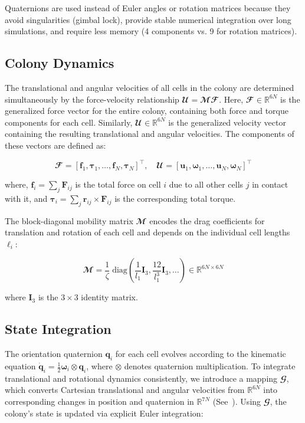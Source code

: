\documentclass[conference]{IEEEtran}
\begin{document}
Quaternions are used instead of Euler angles or rotation matrices because they avoid singularities (gimbal lock), provide stable numerical integration over long simulations, and require less memory (4 components vs. 9 for rotation matrices).

\subsection{Colony Dynamics}

The translational and angular velocities of all cells in the colony are determined simultaneously by the force-velocity relationship $\mathbfcal{U} = \mathbfcal{M} \mathbfcal{F}$. Here, $\mathbfcal{F} \in \mathbb{R}^{6N}$ is the generalized force vector for the entire colony, containing both force and torque components for each cell. Similarly, $\mathbfcal{U} \in \mathbb{R}^{6N}$ is the generalized velocity vector containing the resulting translational and angular velocities. The components of these vectors are defined as:

\begin{equation}
    \mathbfcal{F} = [\mathbf{f}_1, \boldsymbol{\tau}_1, \dots, \mathbf{f}_N, \boldsymbol{\tau}_N]^\top, \quad
    \mathbfcal{U} = [\mathbf{u}_1, \boldsymbol{\omega}_1, \dots, \mathbf{u}_N, \boldsymbol{\omega}_N]^\top
\end{equation}

where, $\mathbf{f}_i = \sum_j \mathbf{F}_{ij}$ is the total force on cell $i$ due to all other cells $j$ in contact with it, and $\boldsymbol{\tau}_i = \sum_j \mathbf{r}_{ij} \times \mathbf{F}_{ij}$ is the corresponding total torque.

The block-diagonal mobility matrix $\mathbfcal{M}$ encodes the drag coefficients for translation and rotation of each cell and depends on the individual cell lengths $\ell_i$:

\begin{equation}
    \mathbfcal{M} = \frac{1}{\zeta}\; \text{diag}\left(\frac{1}{l_1}\mathbf{I}_3, \frac{12}{l_1^3}\mathbf{I}_3, \dots \right) \in \mathbb{R}^{6N \times 6N}
\end{equation}

where $\mathbf{I}_3$ is the $3 \times 3$ identity matrix.

\subsection{State Integration}

The orientation quaternion $\mathbf{q}_i$ for each cell evolves according to the kinematic equation $\dot{\mathbf{q}}_i = \frac{1}{2} \boldsymbol{\omega}_i \otimes \mathbf{q}_i$, where $\otimes$ denotes quaternion multiplication. To integrate translational and rotational dynamics consistently, we introduce a mapping $\mathbfcal{G}$, which converts Cartesian translational and angular velocities from $\mathbb{R}^{6N}$ into corresponding changes in position and quaternion in $\mathbb{R}^{7N}$ (See~\cite{Weady2024SM,Yan2022,Tasora2008}). Using $\mathbfcal{G}$, the colony's state is updated via explicit Euler integration:
\end{document}
